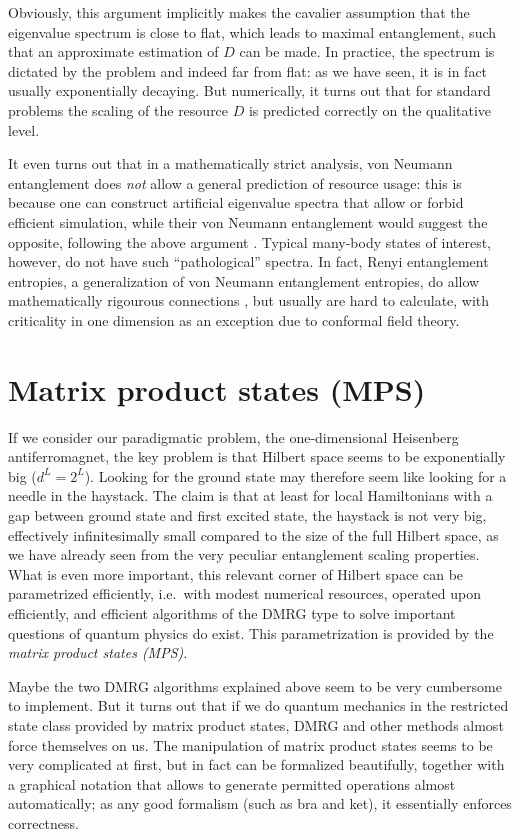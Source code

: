 \documentclass[a4paper,10pt,oneside,onecolumn,1p,times]{elsarticle}
\begin{document}
Obviously, this argument implicitly makes the cavalier assumption that the eigenvalue spectrum is close to flat, which leads to maximal entanglement, such that an approximate estimation of $D$ can be made. In practice, the spectrum is dictated by the problem and indeed far from flat: as we have seen, it is in fact usually exponentially decaying. But numerically, it turns out that for standard problems the scaling of the resource $D$ is predicted correctly on the qualitative level. 

It even turns out that in a mathematically strict analysis, von Neumann entanglement does {\em not} allow a general prediction of resource usage: this is because one can construct artificial eigenvalue spectra that allow or forbid efficient simulation, while their von Neumann entanglement would suggest the opposite, following the above argument \cite{Schuch08}. Typical many-body states of interest, however, do not have such ``pathological'' spectra. In fact, Renyi entanglement entropies, a generalization of von Neumann entanglement entropies, do allow mathematically rigourous connections \cite{Schuch08}, but usually are hard to calculate, with criticality in one dimension as an exception due to conformal field theory.  

\section{Matrix product states (MPS)}
\label{sec:matrixproductstates}

If we consider our paradigmatic problem, the one-dimensional Heisenberg antiferromagnet, the key problem is that Hilbert space seems to be exponentially big ($d^L = 2^L$). Looking for the ground state may therefore seem like looking for a needle in the haystack. The claim is that at least for local Hamiltonians with a gap between ground state and first excited state, the haystack is not very big, effectively infinitesimally small compared to the size of the full Hilbert space, as we have already seen from the very peculiar entanglement scaling properties. What is even more important, this relevant corner of Hilbert space can be parametrized efficiently, i.e.\ with modest numerical resources, operated upon efficiently, and efficient algorithms of the DMRG type to solve important questions of quantum physics do exist. This parametrization is provided by the {\em matrix product states (MPS)}.

Maybe the two DMRG algorithms explained above seem to be very cumbersome to implement. But it turns out that if we do quantum mechanics in the restricted state class provided by matrix product states, DMRG and other methods almost force themselves on us. The manipulation of matrix product states seems to be very complicated at first, but in fact can be formalized beautifully, together with a graphical notation that allows to generate permitted operations almost automatically; as any good formalism (such as bra and ket), it essentially enforces correctness. 
\end{document}
